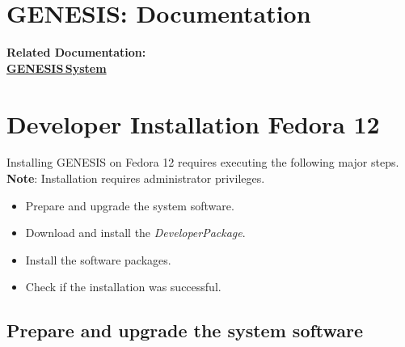 \documentclass[12pt]{article}
\begin{document}
\section*{GENESIS: Documentation}

{\bf Related Documentation:} \\
\href{../genesis-system/genesis-system.tex}{\bf GENESIS\,System}

\section*{Developer Installation Fedora 12}

Installing GENESIS on Fedora 12 requires executing the following major steps. {\bf Note}: Installation requires administrator privileges.
\begin{itemize}
   \item[] Prepare and upgrade the system software.
   \item[] Download and install the {\it DeveloperPackage}.
   \item[] Install the software packages.
   \item[] Check if the installation was successful. 
\end{itemize}

\subsection*{Prepare and upgrade the system software}
\end{document}
